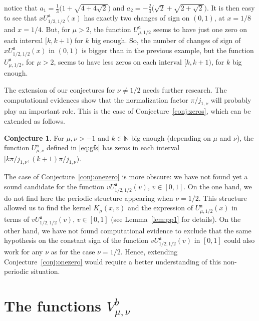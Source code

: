 \documentclass[10pt,a4paper]{article}
\numberwithin{equation}{section}
\theoremstyle{plain}
\theoremstyle{definition}
\newtheorem{Conjecture}{Conjecture}[section]
\newcommand{\aA}{\mathfrak{a}}
\newcommand{\NN}{\mathbb{N}}
\begin{document}
\begin{enumerate}
notice that $a_1 = \frac{1}{3} \big(1+\sqrt{4+4\sqrt{2}}\big)$
and $a_2 = -\frac{2}{3} \big(\sqrt{2}+\sqrt{2+\sqrt{2}}\big)$.
It is then easy to see that $xU_{1/2,1/2}^{\aA}(x)$ has exactly two changes of sign on $(0,1)$, at $x=1/8$ and $x=1/4$. But, for $\mu > 2$, the function $U_{\mu,1/2}^{\aA}$ seems to have just one zero on each interval $[k,k+1)$ for $k$ big enough.
So, the number of changes of sign of $xU_{1/2,1/2}^{\aA}(x)$
in $(0,1)$ is bigger than in the previous example, but the function $U_{\mu,1/2}^{\aA}$, for $\mu>2$, seems to have less zeros on each interval $[k,k+1)$, for $k$ big enough.
\end{enumerate}

The extension of our conjectures for $\nu\not =1/2$ needs further research.
The computational evidences show that the normalization factor $\pi /j_{1,\nu}$ will probably play an important role. This
is the case of Conjecture~\ref{conj:zeros}, which can be extended as follows.

\begin{Conjecture}
For $\mu,\nu>-1$ and $k\in \NN$ big enough (depending on $\mu$ and $\nu$), the function $U_{\mu,\nu}^{\aA}$ defined in \eqref{eq:gfs} has zeros in each interval $[k\pi /j_{1,\nu},(k+1)\pi /j_{1,\nu})$.
\end{Conjecture}

The case of Conjecture~\ref{conj:onezero} is more obscure: we have not found yet a sound candidate for the function $vU_{1/2,1/2}^{\aA}(v)$, $v\in [0,1]$. On the one hand, we do not find here the periodic structure appearing when $\nu=1/2$. This structure allowed us to find the kernel $K_\mu (x,v)$ and the expression of $U_{\mu,1/2}^{\aA}(x)$ in terms of $vU_{1/2,1/2}^{\aA}(v)$, $v\in [0,1]$ (see Lemma~\ref{lem:pp1} for details). On the other hand, we have not found computational evidence to exclude that the same hypothesis on the constant sign of the function $vU_{1/2,1/2}^{\aA}(v)$ in $[0,1]$ could also work for any $\nu$ as for the case $\nu=1/2$. Hence, extending Conjecture~\ref{conj:onezero} would require a better understanding of this non-periodic situation.


\section{The functions $V_{\mu,\nu}^b$}
\label{sec:funV}
\end{document}
